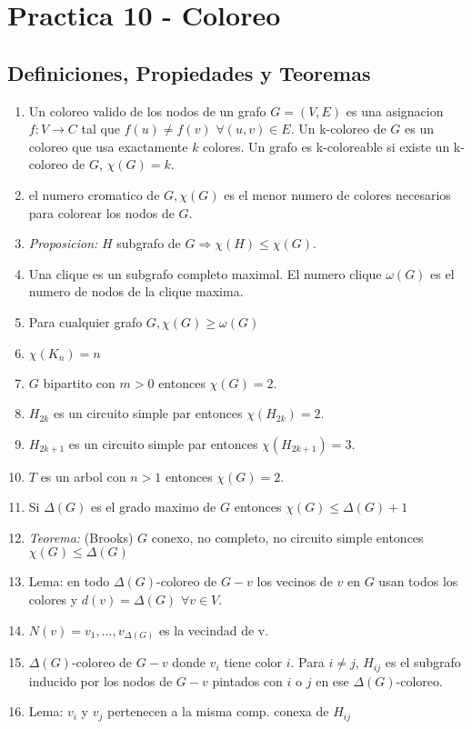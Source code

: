 \section{Practica 10 - Coloreo}
\subsection{Definiciones, Propiedades y Teoremas}
\begin{enumerate}
\item Un coloreo valido de los nodos de un grafo $G=(V,E)$ es una asignacion $f:V\rightarrow C$ tal que $f(u) \neq f(v)$ $\forall(u,v)\in E$. Un k-coloreo de $G$ es un coloreo que usa exactamente $k$ colores. Un grafo es k-coloreable si existe un k-coloreo de $G$, $\chi(G)=k$.
\item el numero cromatico de $G, \chi(G)$ es el menor numero de colores necesarios para colorear los nodos de $G$.
\item \textit{Proposicion:} $H$ subgrafo de $G \Rightarrow \chi(H) \leq \chi(G)$.
\item Una clique es un subgrafo completo maximal. El numero clique $\omega(G)$ es el numero de nodos de la clique maxima.
\item Para cualquier grafo $G, \chi(G) \geq \omega(G)$
\item $\chi(K_{n}) = n$
\item $G$ bipartito con $m>0$ entonces $\chi(G) = 2$.
\item $H_{2k}$ es un circuito simple par entonces $\chi(H_{2k}) = 2$.
\item $H_{2k+1}$ es un circuito simple par entonces $\chi(H_{2k+1}) = 3$.
\item $T$ es un arbol con $n>1$ entonces $\chi(G) = 2$.
\item Si $\Delta(G)$ es el grado maximo de $G$ entonces $\chi(G) \leq \Delta(G)+1$
\item \textit{Teorema:} (Brooks) $G$ conexo, no completo, no circuito simple entonces $\chi(G) \leq \Delta(G)$
\item Lema: en todo $\Delta(G)$-coloreo de $G-{v}$ los vecinos de $v$ en $G$ usan todos los colores y $d(v) = \Delta(G)$ $\forall v \in V$.
\item $N(v)={v_{1},...,v_{\Delta(G)}}$ es la vecindad de v.
\item $\Delta(G)$-coloreo de $G-{v}$ donde $v_{i}$ tiene color $i$. Para $i \neq j$, $H_{ij}$ es el subgrafo inducido por los nodos de $G-{v}$ pintados con $i$ o $j$ en ese $\Delta(G)$-coloreo.
\item Lema: $v_{i}$ y $v_{j}$ pertenecen a la misma comp. conexa de $H_{ij}$

\end{enumerate}
